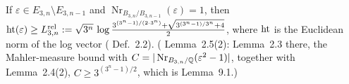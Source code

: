 If $\varepsilon\in E_{3,n}\setminus E_{3,n-1}$ and $\operatorname{Nr}_{B_{3,n}/B_{3,n-1}}(\varepsilon)=1$, then $\operatorname{ht}(\varepsilon)\ge L^{\mathrm{rel}}_{3,n}:=\sqrt{3^n}\,\log\frac{3^{(3^n-1)/(2\cdot3^n)}+\sqrt{3^{(3^n-1)/3^n}+4}}2$, where $\operatorname{ht}$ is the Euclidean norm of the log vector (\cite{MO16} Def.~2.2). (\cite{MO16} Lemma~2.5(2): Lemma~2.3 there, the Mahler-measure bound with $C=|\operatorname{Nr}_{B_{3,n}/\mathbb{Q}}(\varepsilon^2-1)|$, together with Lemma~2.4(2), $C\ge3^{(3^n-1)/2}$, which is \cite{MO13} Lemma~9.1.)
